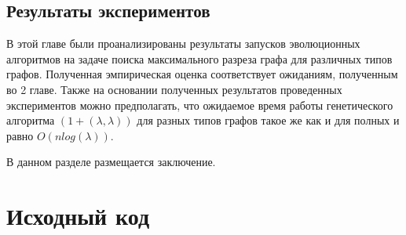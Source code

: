 \documentclass[times]{itmo-student-thesis}
\newcommand{\alglambda}{${(1 + (\lambda , \lambda))}$\xspace}
\newcommand{\ollga}{${(1 + (\lambda , \lambda))}$-ГА\xspace}
\begin{document}
\section{Результаты экспериментов}

\chapterconclusion
В этой главе были проанализированы результаты запусков эволюционных алгоритмов на задаче поиска максимального разреза графа для различных типов графов. Полученная эмпирическая оценка соответствует ожиданиям, полученным во 2 главе.
Также на основании полученных результатов проведенных экспериментов можно предполагать, что ожидаемое время работы генетического алгоритма \alglambda для разных типов графов такое же как и для полных и равно $O(nlog(\lambda))$.

\startconclusionpage

В данном разделе размещается заключение.

\printmainbibliography

\appendix

\chapter{Исходный код}\label{sec:app:1}

\begin{lstlisting}[caption={Реализация \ollga со сбором статистики},label={ollgaStat}]

\end{lstlisting}
\end{document}
